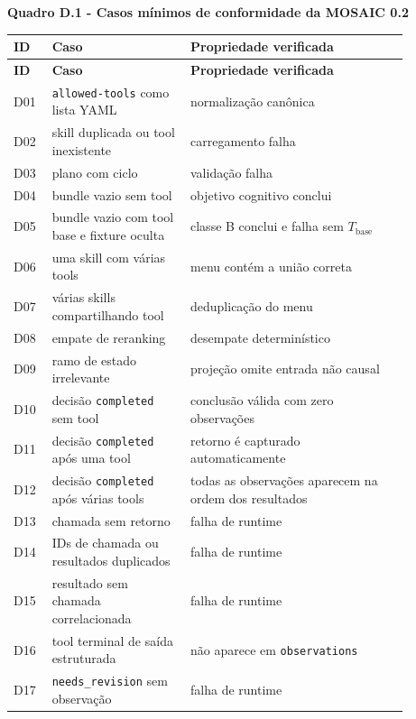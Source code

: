 \begin{center}
\textbf{Quadro D.1 - Casos mínimos de conformidade da MOSAIC 0.2}
\end{center}
\scriptsize
\renewcommand{\arraystretch}{1.08}
\begin{longtable}{|p{0.07\linewidth}|p{0.31\linewidth}|p{0.49\linewidth}|}
\hline
\textbf{ID} & \textbf{Caso} & \textbf{Propriedade verificada} \\
\hline
\endfirsthead
\hline
\textbf{ID} & \textbf{Caso} & \textbf{Propriedade verificada} \\
\hline
\endhead
D01 & \texttt{allowed-tools} como lista YAML & normalização canônica \\
\hline
D02 & skill duplicada ou tool inexistente & carregamento falha \\
\hline
D03 & plano com ciclo & validação falha \\
\hline
D04 & bundle vazio sem tool & objetivo cognitivo conclui \\
\hline
D05 & bundle vazio com tool base e fixture oculta & classe B conclui e falha sem \(T_{\mathrm{base}}\) \\
\hline
D06 & uma skill com várias tools & menu contém a união correta \\
\hline
D07 & várias skills compartilhando tool & deduplicação do menu \\
\hline
D08 & empate de reranking & desempate determinístico \\
\hline
D09 & ramo de estado irrelevante & projeção omite entrada não causal \\
\hline
D10 & decisão \texttt{completed} sem tool & conclusão válida com zero observações \\
\hline
D11 & decisão \texttt{completed} após uma tool & retorno é capturado automaticamente \\
\hline
D12 & decisão \texttt{completed} após várias tools & todas as observações aparecem na ordem dos resultados \\
\hline
D13 & chamada sem retorno & falha de runtime \\
\hline
D14 & IDs de chamada ou resultados duplicados & falha de runtime \\
\hline
D15 & resultado sem chamada correlacionada & falha de runtime \\
\hline
D16 & tool terminal de saída estruturada & não aparece em \texttt{observations} \\
\hline
D17 & \texttt{needs\_revision} sem observação & falha de runtime \\

\end{longtable}
